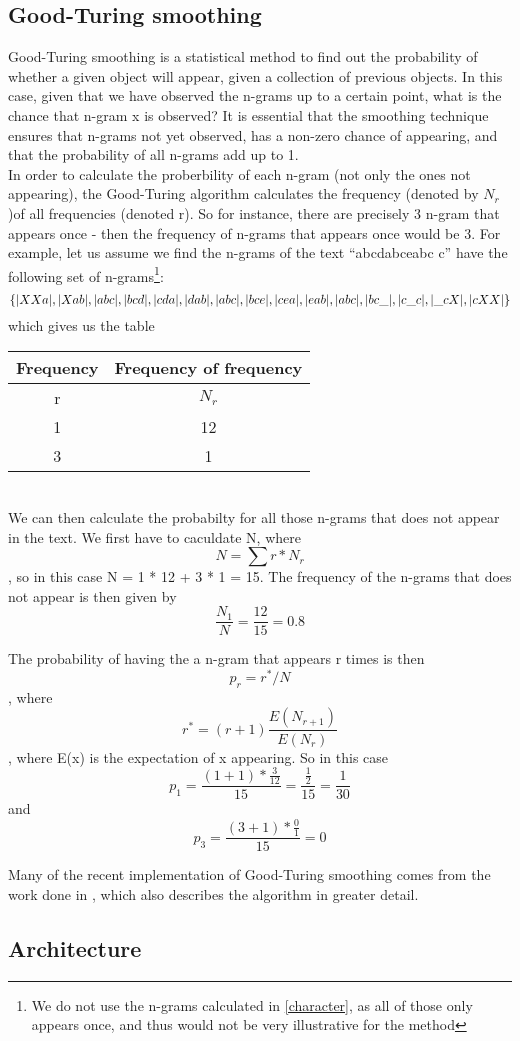 \subsection{Good-Turing smoothing}
\label{Good-Turing}
Good-Turing smoothing is a statistical method to find out the probability of whether a given object will appear, given a collection of previous objects. In this case, given that we have observed the n-grams up to a certain point, what is the chance that n-gram x is observed? It is essential that the smoothing technique ensures that n-grams not yet observed, has a non-zero chance of appearing, and that the probability of all n-grams add up to 1.\\

In order to calculate the proberbility of each n-gram (not only the ones not appearing), the Good-Turing algorithm calculates the frequency (denoted by $N_r$)of all frequencies (denoted r). So for instance, there are precisely 3 n-gram that appears once - then the frequency of n-grams that appears once would be 3. For example, let us assume we find the n-grams of the text ``abcdabceabc c'' have the following set of n-grams\footnote{We do not use the n-grams calculated in \ref{character}, as all of those only appears once, and thus would not be very illustrative for the method}:\\
$$
\{|XXa|, |Xab|, |abc|, |bcd|, |cda|, |dab|, |abc|, |bce|, |cea|, |eab|, |abc|, |bc\_|, |c\_c|, |\_cX|, |cXX| \}
$$
which gives us the table\\
\begin{tabular}{|cc|}
\hline
Frequency & Frequency of frequency \\
\hline
r & $N_{r}$ \\
1 & 12\\
3 & 1\\
\hline
\end{tabular}
\\
We can then calculate the probabilty for all those n-grams that does not appear in the text. We first have to caculdate N, where 
$$
N = \sum r * N_r
$$
, so in this case N = 1 * 12 + 3 * 1 = 15. The frequency of the n-grams that does not appear is then given by 
$$
\frac{N_1}{N} = \frac{12}{15} = 0.8
$$

The probability of having the a n-gram that appears r times is then 
$$p_r = r^*/N$$
, where 
$$r^* = (r+1)\frac{E(N_{r+1})}{E(N_r)}$$
, where E(x) is the expectation of x appearing. So in this case 
$$p_1 = \frac{(1 + 1) * \frac{3}{12}}{15} = \frac{\frac{1}{2}}{15} = \frac{1}{30}$$ and  
$$p_3 = \frac{(3 + 1) * \frac{0}{1}}{15} = 0$$

Many of the recent implementation of Good-Turing smoothing comes from the work done in \cite{Gale94good-turingsmoothing}, which also describes the algorithm in greater detail.

\subsection{Architecture}
